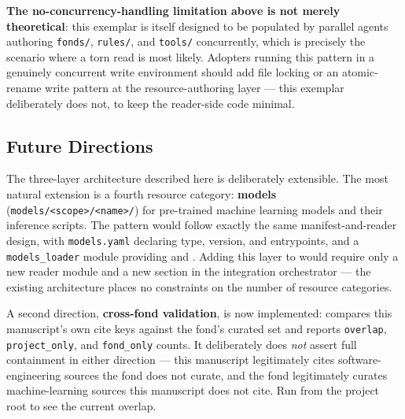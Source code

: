 \documentclass[
]{article}
\begin{document}
\textbf{The no-concurrency-handling limitation above is not merely
theoretical}: this exemplar is itself designed to be populated by
parallel agents authoring \texttt{fonds/}, \texttt{rules/}, and
\texttt{tools/} concurrently, which is precisely the scenario where a
torn read is most likely. Adopters running this pattern in a genuinely
concurrent write environment should add file locking or an atomic-rename
write pattern at the resource-authoring layer --- this exemplar
deliberately does not, to keep the reader-side code minimal.

\subsection{Future Directions}\label{future-directions}

The three-layer architecture described here is deliberately extensible.
The most natural extension is a fourth resource category:
\textbf{models}
(\texttt{models/\textless{}scope\textgreater{}/\textless{}name\textgreater{}/})
for pre-trained machine learning models and their inference scripts. The
pattern would follow exactly the same manifest-and-reader design, with
\texttt{models.yaml} declaring type, version, and entrypoints, and a
\texttt{models\_loader} module providing  and
. Adding this layer to
 would require only a new reader
module and a new section in the integration orchestrator --- the
existing architecture places no constraints on the number of resource
categories.

A second direction, \textbf{cross-fond validation}, is now implemented:
compares this manuscript's own cite keys against the
 fond's curated set and reports
\texttt{overlap}, \texttt{project\_only}, and \texttt{fond\_only}
counts. It deliberately does \emph{not} assert full containment in
either direction --- this manuscript legitimately cites
software-engineering sources the fond does not curate, and the fond
legitimately curates machine-learning sources this manuscript does not
cite. Run
from the project root to see the current overlap.
\end{document}

